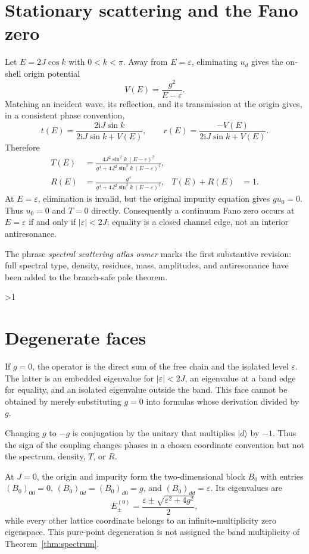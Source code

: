 \documentclass[9pt]{extarticle}
\providecommand{\CRevisionRound}{2}
\newcommand{\ii}{\mathrm i}
\begin{document}
\section{Stationary scattering and the Fano zero}
Let $E=2J\cos k$ with $0<k<\pi$.  Away from $E=\varepsilon$, eliminating
$u_d$ gives the on-shell origin potential
\[
 V(E)=\frac{g^2}{E-\varepsilon}.
\]
Matching an incident wave, its reflection, and its transmission at the origin
gives, in a consistent phase convention,
\begin{equation}\label{eq:amplitudes}
 t(E)=\frac{2\ii J\sin k}{2\ii J\sin k+V(E)},\qquad
 r(E)=\frac{-V(E)}{2\ii J\sin k+V(E)}.
\end{equation}
Therefore
\begin{align}
 T(E)&=\frac{4J^2\sin^2k\,(E-\varepsilon)^2}
 {g^4+4J^2\sin^2k\,(E-\varepsilon)^2},\label{eq:T}\\
 R(E)&=\frac{g^4}
 {g^4+4J^2\sin^2k\,(E-\varepsilon)^2},
 &T(E)+R(E)&=1.\label{eq:R}
\end{align}
At $E=\varepsilon$, elimination is invalid, but the original impurity
equation gives $g u_0=0$.  Thus $u_0=0$ and $T=0$ directly.  Consequently a
continuum Fano zero occurs at $E=\varepsilon$ if and only if
$|\varepsilon|<2J$; equality is a closed channel edge, not an interior
antiresonance.

The phrase \emph{spectral scattering atlas owner} marks the first substantive
revision: full spectral type, density, residues, mass, amplitudes, and
antiresonance have been added to the branch-safe pole theorem.
\fi

\ifnum\CRevisionRound>1
\section{Degenerate faces}
If $g=0$, the operator is the direct sum of the free chain and the isolated
level $\varepsilon$.  The latter is an embedded eigenvalue for
$|\varepsilon|<2J$, an eigenvalue at a band edge for equality, and an
isolated eigenvalue outside the band.  This face cannot be obtained by merely
substituting $g=0$ into formulas whose derivation divided by $g$.

Changing $g$ to $-g$ is conjugation by the unitary that multiplies
$|d\rangle$ by $-1$.  Thus the sign of the coupling changes phases in a
chosen coordinate convention but not the spectrum, density, $T$, or $R$.

At $J=0$, the origin and impurity form the two-dimensional block $B_0$
with entries $(B_0)_{00}=0$, $(B_0)_{0d}=(B_0)_{d0}=g$, and
$(B_0)_{dd}=\varepsilon$.  Its eigenvalues are
\[
 E_{\pm}^{(0)}=\frac{\varepsilon\pm\sqrt{\varepsilon^2+4g^2}}2,
\]
while every other lattice coordinate belongs to an infinite-multiplicity
zero eigenspace.  This pure-point degeneration is not assigned the band
multiplicity of Theorem~\ref{thm:spectrum}.
\end{document}
